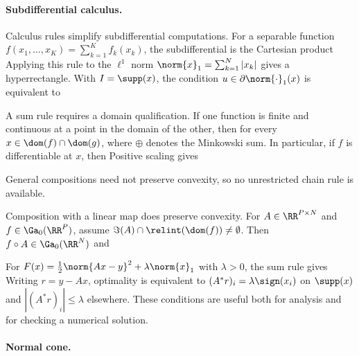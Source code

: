    
\paragraph{Subdifferential calculus.}

Calculus rules simplify subdifferential computations. For a separable function $f(x_1,\ldots,x_K)=\sum_{k=1}^K f_k(x_k)$, the subdifferential is the Cartesian product
Applying this rule to the $\ell^1$ norm $\norm{x}_1=\sum_{k=1}^N |x_k|$ gives
a hyperrectangle. With $I = \supp(x)$, the condition $u \in \partial \norm{\cdot}_1(x)$ is equivalent to

A sum rule requires a domain qualification. If one function is finite and continuous at a point in the domain of the other, then for every $x\in\dom(f)\cap\dom(g)$,
where $\oplus$ denotes the Minkowski sum. In particular, if $f$ is differentiable at $x$, then
Positive scaling gives

General compositions need not preserve convexity, so no unrestricted chain rule is available.
 
Composition with a linear map does preserve convexity. For $A \in \RR^{P \times N}$ and $f \in \Ga_0(\RR^P)$, assume $\Im(A)\cap\relint(\dom(f))\neq\emptyset$. Then $f \circ A \in \Ga_0(\RR^N)$ and

\begin{rem}
For $F(x)=\frac12\norm{Ax-y}^2+\lambda\norm{x}_1$ with $\lambda>0$, the sum rule gives
Writing $r=y-Ax$, optimality is equivalent to $(A^*r)_i=\lambda\sign(x_i)$ on $\supp(x)$ and $|(A^*r)_i|\leq\lambda$ elsewhere. These conditions are useful both for analysis and for checking a numerical solution.
\end{rem}

   
\paragraph{Normal cone.}


